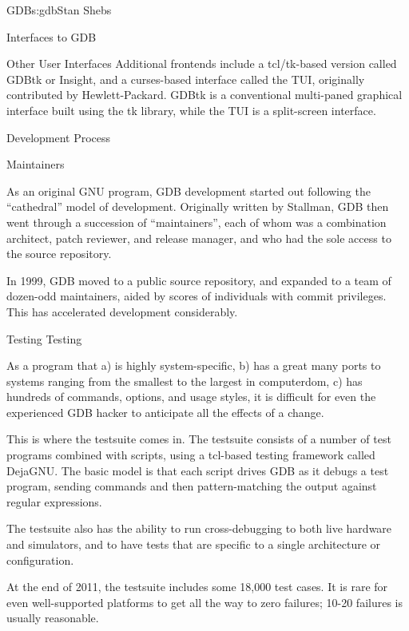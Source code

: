 \begin{aosachapter}{GDB}{s:gdb}{Stan Shebs}
\begin{aosasect1}{Interfaces to GDB}
\begin{aosasect2}{Other User Interfaces}
Additional frontends include a tcl/tk-based version called GDBtk or
Insight, and a curses-based interface called the TUI, originally
contributed by Hewlett-Packard.  GDBtk is a conventional multi-paned
graphical interface built using the tk library, while the TUI is a
split-screen interface.

\end{aosasect2}

\end{aosasect1}

\begin{aosasect1}{Development Process}

\begin{aosasect2}{Maintainers}

As an original GNU program, GDB development started out following the
``cathedral'' model of development.  Originally written by Stallman,
GDB then went through a succession of ``maintainers'', each of whom
was a combination architect, patch reviewer, and release manager, and
who had the sole access to the source repository.

In 1999, GDB moved to a public source repository, and expanded to a
team of dozen-odd maintainers, aided by scores of individuals with
commit privileges.  This has accelerated development considerably.

\end{aosasect2}

\begin{aosasect2}{Testing Testing}

As a program that a) is highly system-specific, b) has a great many
ports to systems ranging from the smallest to the largest in
computerdom, c) has hundreds of commands, options, and usage styles,
it is difficult for even the experienced GDB hacker to anticipate all
the effects of a change.

This is where the testsuite comes in.  The testsuite consists of a
number of test programs combined with  scripts, using a
tcl-based testing framework called DejaGNU.  The basic model is that
each script drives GDB as it debugs a test program, sending commands and
then pattern-matching the output against regular expressions.

The testsuite also has the ability to run cross-debugging to both live
hardware and simulators, and to have tests that are specific to a
single architecture or configuration.

At the end of 2011, the testsuite includes some 18,000 test cases.  It
is rare for even well-supported platforms to get all the way to zero
failures; 10-20 failures is usually reasonable.


\end{aosasect2}
\end{aosasect1}
\end{aosachapter}

